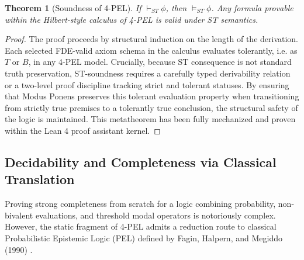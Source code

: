 \documentclass[11pt,a4paper]{article}
\newtheorem{theorem}{Theorem}[section]
\begin{document}
\begin{theorem}[Soundness of 4-PEL]
If $\vdash_{ST} \phi$, then $\models_{ST} \phi$. Any formula provable within the Hilbert-style calculus of 4-PEL is valid under ST semantics.
\end{theorem}
\begin{proof}
The proof proceeds by structural induction on the length of the derivation. Each selected FDE-valid axiom schema in the calculus evaluates tolerantly, i.e. as $T$ or $B$, in any 4-PEL model. Crucially, because ST consequence is not standard truth preservation, ST-soundness requires a carefully typed derivability relation or a two-level proof discipline tracking strict and tolerant statuses. By ensuring that Modus Ponens preserves this tolerant evaluation property when transitioning from strictly true premises to a tolerantly true conclusion, the structural safety of the logic is maintained. This metatheorem has been fully mechanized and proven within the Lean 4 proof assistant kernel.
\end{proof}

\subsection{Decidability and Completeness via Classical Translation}
Proving strong completeness from scratch for a logic combining probability, non-bivalent evaluations, and threshold modal operators is notoriously complex. However, the static fragment of 4-PEL admits a reduction route to classical Probabilistic Epistemic Logic (PEL) defined by Fagin, Halpern, and Megiddo (1990) \cite{fagin1990}.
\end{document}
